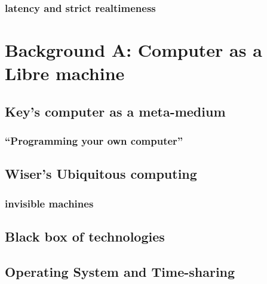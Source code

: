 \hypertarget{latency-and-strict-realtimeness}{%
\subsection{latency and strict
realtimeness}\label{latency-and-strict-realtimeness}}

\hypertarget{background-a-computer-as-a-libre-machine}{%
\chapter{Background A: Computer as a Libre
machine}\label{background-a-computer-as-a-libre-machine}}

\hypertarget{keys-computer-as-a-meta-medium}{%
\section{Key's computer as a
meta-medium}\label{keys-computer-as-a-meta-medium}}

\hypertarget{programming-your-own-computer}{%
\subsection{``Programming your own
computer''}\label{programming-your-own-computer}}

\hypertarget{wisers-ubiquitous-computing}{%
\section{Wiser's Ubiquitous
computing}\label{wisers-ubiquitous-computing}}

\hypertarget{invisible-machines}{%
\subsection{invisible machines}\label{invisible-machines}}

\hypertarget{black-box-of-technologies}{%
\section{Black box of technologies}\label{black-box-of-technologies}}

\hypertarget{operating-system-and-time-sharing}{%
\section{Operating System and
Time-sharing}\label{operating-system-and-time-sharing}}

